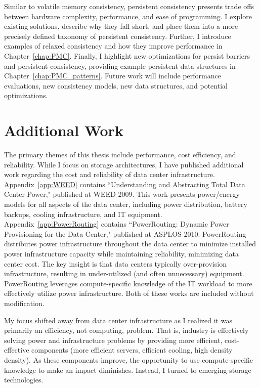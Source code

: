 Similar to volatile memory consistency, persistent consistency presents trade offs between hardware complexity, performance, and ease of programming.
I explore existing solutions, describe why they fall short, and place them into a more precisely defined taxonomy of persistent consistency.
Further, I introduce examples of relaxed consistency and how they improve performance in Chapter~\ref{chap:PMC}.
Finally, I highlight new optimizations for persist barriers and persistent consistency, providing example persistent data structures in Chapter~\ref{chap:PMC_patterns}.
Future work will include performance evaluations, new consistency models, new data structures, and potential optimizations.

\section{Additional Work}
\label{sec:Intro:Additional}
The primary themes of this thesis include performance, cost efficiency, and reliability.
While I focus on storage architectures, I have published additional work regarding the cost and reliability of data center infrastructure.
Appendix~\ref{app:WEED} contains ``Understanding and Abstracting Total Data Center Power," \cite{PelleyMeisner09} published at WEED 2009.
This work presents power/energy models for all aspects of the data center, including power distribution, battery backups, cooling infrastructure, and IT equipment.
Appendix~\ref{app:PowerRouting} contains ``PowerRouting: Dynamic Power Provisioning for the Data Center," \cite{PelleyMeisner10} published at ASPLOS 2010.
PowerRouting distributes power infrastructure throughout the data center to minimize installed power infrastructure capacity while maintaining reliability, minimizing data center cost.
The key insight is that data centers typically over-provision infrastructure, resulting in under-utilized (and often unnecessary) equipment.
PowerRouting leverages compute-specific knowledge of the IT workload to more effectively utilize power infrastructure.
Both of these works are included without modification.

My focus shifted away from data center infrastructure as I realized it was primarily an efficiency, not computing, problem.
That is, industry is effectively solving power and infrastructure problems by providing more efficient, cost-effective components (more efficient servers, efficient cooling, high density density).
As these components improve, the opportunity to use compute-specific knowledge to make an impact diminishes.
Instead, I turned to emerging storage technologies.

